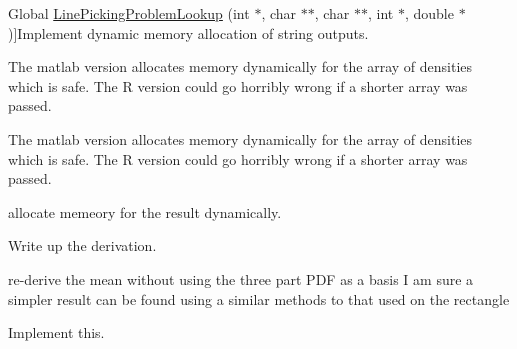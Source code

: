 \begin{DoxyRefList}
Global \hyperlink{group__api_gaab56d0ac9177e8ec90b87d0927220283}{Line\-Picking\-Problem\-Lookup} (int $\ast$, char $\ast$$\ast$, char $\ast$$\ast$, int $\ast$, double $\ast$)]Implement dynamic memory allocation of string outputs.  
\item[\label{todo__todo000028}%
\hypertarget{todo__todo000028}{}%
Global \hyperlink{group__api_gade24923f75c83155e6cf15f3d7d7cb09}{Line\-Picking\-Sim\-Distances} (double $\ast$distances, int $\ast$\-N, int $\ast$problem, double $\ast$parameters, int $\ast$\-Npar, int $\ast$result, char $\ast$$\ast$error\-\_\-str)]The matlab version allocates memory dynamically for the array of densities which is safe. The R version could go horribly wrong if a shorter array was passed.  
\item[\label{todo__todo000027}%
\hypertarget{todo__todo000027}{}%
Global \hyperlink{group__api_gad3880c7898c35953c9c55ced33beb222}{Line\-Picking\-Sim\-Points} (double $\ast$$\ast$points, int $\ast$\-Npoints, int $\ast$\-Ncoords, int $\ast$problem, double $\ast$parameters, int $\ast$\-Npar, int $\ast$result, char $\ast$$\ast$error\-\_\-str)]The matlab version allocates memory dynamically for the array of densities which is safe. The R version could go horribly wrong if a shorter array was passed.  
\item[\label{todo__todo000022}%
\hypertarget{todo__todo000022}{}%
Global \hyperlink{group__api_ga0aec0b2f87903f4bf4ad3011a99b3446}{Line\-Picking\-Support} (double $\ast$, int $\ast$, double $\ast$, int $\ast$, int $\ast$, char $\ast$$\ast$)]allocate memeory for the result dynamically.  
\item[\label{todo__todo000031}%
\hypertarget{todo__todo000031}{}%
Global \hyperlink{_prism_geodesic_8h_a8fb219075b27e66757a3b5c234097c4d}{Prism\-Geodesic\-Distance\-C\-D\-F} (double t, double $\ast$parameters)]Write up the derivation.  
\item[\label{todo__todo000032}%
\hypertarget{todo__todo000032}{}%
Global \hyperlink{_prism_geodesic_8h_a8ac24433806e383dec481431b92b4606}{Prism\-Geodesic\-Distance\-Mean} (double $\ast$parameters)]re-\/derive the mean without using the three part P\-D\-F as a basis I am sure a simpler result can be found using a similar methods to that used on the rectangle  
\item[\label{todo__todo000034}%
\hypertarget{todo__todo000034}{}%
Global \hyperlink{_prism_geodesic_8h_a6a025e73af4f9b3e74325ab0421bd949}{Prism\-Geodesic\-Distance\-Metric} (int Ncoords, double $\ast$point1, double $\ast$point2, double $\ast$parameters)]Implement this.  

\end{DoxyRefList}
